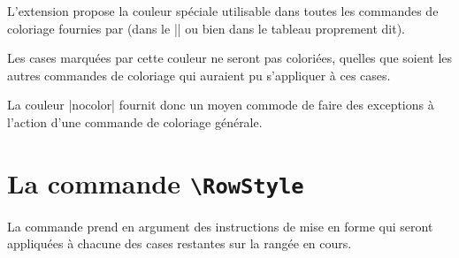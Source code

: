 \documentclass[dvipsnames]{article}
\begin{document}

L'extension  propose la couleur spéciale 
utilisable dans toutes les commandes de coloriage fournies par 
(dans le |\CodeBefore| ou bien dans le tableau proprement dit).

Les cases marquées par cette couleur ne seront pas coloriées, quelles que soient
les autres commandes de coloriage qui auraient pu s'appliquer à ces cases. 

La couleur |nocolor| fournit donc un moyen commode de faire des exceptions à
l'action d'une commande de coloriage générale.


\section{La commande \texttt{\textbackslash RowStyle}}

\label{RowStyle}


La commande  prend en argument des instructions de
mise en forme qui seront appliquées à chacune des cases restantes sur la rangée
en cours.
\end{document}
